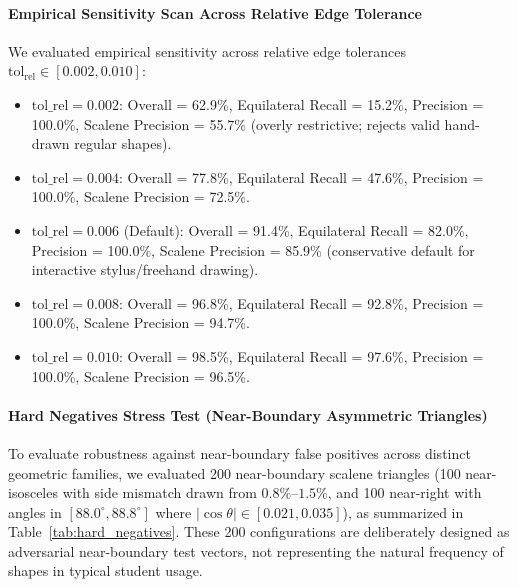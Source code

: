 \documentclass[preprint,12pt]{elsarticle}
\begin{document}
\paragraph{Empirical Sensitivity Scan Across Relative Edge Tolerance}
We evaluated empirical sensitivity across relative edge tolerances $\mathrm{tol_{rel}} \in [0.002, 0.010]$:
\begin{itemize}
\item $\text{tol\_rel} = 0.002$: Overall = 62.9\%, Equilateral Recall = 15.2\%, Precision = 100.0\%, Scalene Precision = 55.7\% (overly restrictive; rejects valid hand-drawn regular shapes).
\item $\text{tol\_rel} = 0.004$: Overall = 77.8\%, Equilateral Recall = 47.6\%, Precision = 100.0\%, Scalene Precision = 72.5\%.
\item $\text{tol\_rel} = 0.006$ (Default): Overall = 91.4\%, Equilateral Recall = 82.0\%, Precision = 100.0\%, Scalene Precision = 85.9\% (conservative default for interactive stylus/freehand drawing).
\item $\text{tol\_rel} = 0.008$: Overall = 96.8\%, Equilateral Recall = 92.8\%, Precision = 100.0\%, Scalene Precision = 94.7\%.
\item $\text{tol\_rel} = 0.010$: Overall = 98.5\%, Equilateral Recall = 97.6\%, Precision = 100.0\%, Scalene Precision = 96.5\%.
\end{itemize}

\paragraph{Hard Negatives Stress Test (Near-Boundary Asymmetric Triangles)}
To evaluate robustness against near-boundary false positives across distinct geometric families, we evaluated 200 near-boundary scalene triangles (100 near-isosceles with side mismatch drawn from $0.8\%\text{--}1.5\%$, and 100 near-right with angles in $[88.0^\circ, 88.8^\circ]$ where $|\cos \theta| \in [0.021, 0.035]$), as summarized in Table~\ref{tab:hard_negatives}. These 200 configurations are deliberately designed as adversarial near-boundary test vectors, not representing the natural frequency of shapes in typical student usage.
\end{document}
